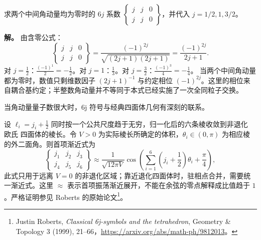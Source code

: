 \begin{example}[{两个中间角动量为零的 6j 符号}]
求两个中间角动量均为零时的 $6j$ 系数 $\left\{\begin{smallmatrix}j&j&0\\j&j&0\end{smallmatrix}\right\}$，并代入 $j=1/2,1,3/2$。

\textbf{解。} 由含零公式：
\[
\begin{Bmatrix}j&j&0\\j&j&0\end{Bmatrix}
=\frac{(-1)^{2j}}{\sqrt{(2j+1)(2j+1)}}
=\frac{(-1)^{2j}}{2j+1}.
\]
对 $j=\frac12$：$\frac{(-1)^1}{2}=-\frac12$。对 $j=1$：$\frac{1}{3}$。对 $j=\frac32$：$\frac{(-1)^3}{4}=-\frac14$。
当两个中间角动量都为零时，数值只剩维数因子 $(2j+1)^{-1}$ 与约定相位 $(-1)^{2j}$。这里的相位来自耦合基约定；半整数角动量并不等同于本式已经实施了一次全同粒子交换。
\end{example}
当角动量量子数很大时，6j 符号与经典四面体几何有深刻的联系。
\begin{theorem}
设 $\ell_i=j_i+\tfrac12$ 同时按一个公共尺度趋于无穷，归一化后的六条棱收敛到非退化 欧氏 四面体的棱长。令 $V>0$ 为实际棱长所确定的体积，$\theta_i\in(0,\pi)$ 为相应棱的外二面角。则首项渐近式为
\[
\begin{Bmatrix}j_1&j_2&j_3\\j_4&j_5&j_6\end{Bmatrix}
\approx\frac{1}{\sqrt{12\pi V}}
\cos\!\left(\sum_{i=1}^6\left(j_i+\frac12\right)\theta_i+\frac{\pi}{4}\right),
\]
此式只用于远离 $V=0$ 的非退化区域；靠近退化四面体时，驻相点合并，需要统一渐近式。这里 $\approx$ 表示首项振荡渐近展开，不能在余弦的零点解释成比值趋于 $1$。严格证明参见 Roberts 的原始论文\footnote{Justin Roberts, \emph{Classical 6j-symbols and the tetrahedron}, Geometry \& Topology 3 (1999), 21--66，\url{https://arxiv.org/abs/math-ph/9812013}。}。
\label{thm:ponzano-regge}
\end{theorem}


